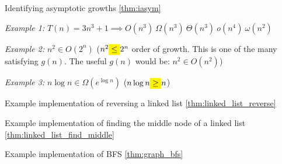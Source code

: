 \begin{example}
    \label{eg:iasym_1}
    Identifying asymptotic growths \ref{thm:iasym}

    \textit{Example 1: }$T(n)=3n^3+1\implies O(n^3)\ \Omega(n^3)\ \Theta(n^3)\ o(n^4)\ \omega(n^2)$

    \textit{Example 2: }$n^2 \in O(2^n)$ ($n^2 \mathcolorbox{yellow}{\leq} 2^n$ order of growth. This is one of the many satisfying $g(n)$. The useful $g(n)$ would be: $n^2 \in O(n^2)$)

    \textit{Example 3: }$n\log n \in \Omega(e^{\log n})$  ($n\log n \mathcolorbox{yellow}{\geq} n$)
\end{example}

\begin{example}
    \label{eg:linked_list_reverse}
    Example implementation of reversing a linked list \ref{thm:linked_list_reverse}
\end{example}


\begin{example}
    \label{eg:linked_list_find_middle}
    Example implementation of finding the middle node of a linked list \ref{thm:linked_list_find_middle}
\end{example}


\begin{example}
    \label{eg:graph_bfs}
    Example implementation of BFS \ref{thm:graph_bfs}
\end{example}


